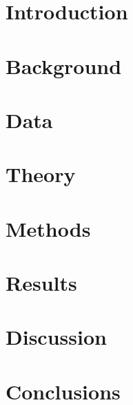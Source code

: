 \documentclass[a4paper, 12pt, openany]{book} %
\begin{document}

\chapter{Introduction}

\cleardoublepage

\chapter{Background}
\label{chap:background}

\cleardoublepage

\chapter{Data}

\cleardoublepage

\chapter{Theory}

\cleardoublepage


\chapter{Methods}

\cleardoublepage


\chapter{Results}

\cleardoublepage


\chapter{Discussion}

\cleardoublepage


\chapter{Conclusions}

\cleardoublepage


\printbibliography[title={References}] %
\cleardoublepage
\end{document}
